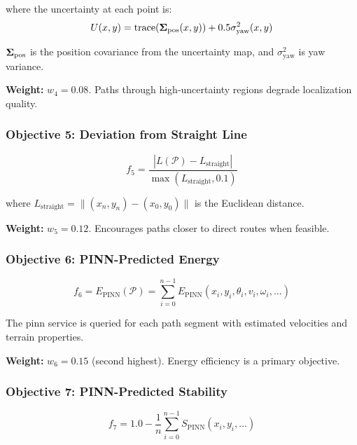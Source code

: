 where the uncertainty at each point is:
\begin{equation}
U(x, y) = \text{trace}(\mathbf{\Sigma}_{\text{pos}}(x, y)) + 0.5 \sigma_{\text{yaw}}^2(x, y)
\label{eq:uncertainty_metric}
\end{equation}

$\mathbf{\Sigma}_{\text{pos}}$ is the position covariance from the uncertainty map, and $\sigma_{\text{yaw}}^2$ is yaw variance.

\textbf{Weight:} $w_4 = 0.08$. Paths through high-uncertainty regions degrade localization quality.

\subsubsection{Objective 5: Deviation from Straight Line}
\begin{equation}
f_5 = \frac{|L(\mathcal{P}) - L_{\text{straight}}|}{\max(L_{\text{straight}}, 0.1)}
\label{eq:obj_deviation}
\end{equation}

where $L_{\text{straight}} = \|(x_n, y_n) - (x_0, y_0)\|$ is the Euclidean distance.

\textbf{Weight:} $w_5 = 0.12$. Encourages paths closer to direct routes when feasible.

\subsubsection{Objective 6: PINN-Predicted Energy}
\begin{equation}
f_6 = E_{\text{PINN}}(\mathcal{P}) = \sum_{i=0}^{n-1} E_{\text{PINN}}(x_i, y_i, \theta_i, v_i, \omega_i, \ldots)
\label{eq:obj_pinn_energy}
\end{equation}

The \acrshort{pinn} service is queried for each path segment with estimated velocities and terrain properties.

\textbf{Weight:} $w_6 = 0.15$ (second highest). Energy efficiency is a primary objective.

\subsubsection{Objective 7: PINN-Predicted Stability}
\begin{equation}
f_7 = 1.0 - \frac{1}{n} \sum_{i=0}^{n-1} S_{\text{PINN}}(x_i, y_i, \ldots)
\label{eq:obj_pinn_stability}
\end{equation}

